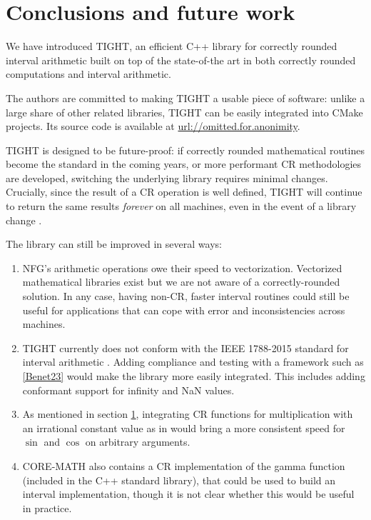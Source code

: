 \section{Conclusions and future work}
We have introduced TIGHT, an efficient C++ library for correctly rounded interval arithmetic built on top of the state-of-the art in both correctly rounded computations and interval arithmetic.

The authors are committed to making TIGHT a usable piece of software: unlike a large share of other related libraries, TIGHT can be easily integrated into CMake projects. Its source code is available at \url{url://omitted.for.anonimity}.

TIGHT is designed to be future-proof: if correctly rounded mathematical routines become the standard in the coming years, or more performant CR methodologies are developed, switching the underlying library requires minimal changes.
Crucially, since the result of a CR operation is well defined, TIGHT will continue to return the same results \emph{forever} on all machines, even in the event of a library change
.

The library can still be improved in several ways:
\begin{enumerate}
	\item NFG's arithmetic operations owe their speed to vectorization. Vectorized mathematical libraries exist \cite{sleef} but we are not aware of a correctly-rounded solution. In any case, having non-CR, faster interval routines could still be useful for applications that can cope with error and inconsistencies across machines.
	\item TIGHT currently does not conform with the IEEE 1788-2015 standard for interval arithmetic \cite{ieee1788}. Adding compliance and testing with a framework such as \ref{Benet23} would make the library more easily integrated. This includes adding conformant support for infinity and NaN values.
	\item As mentioned in section \ref{}, integrating CR functions for multiplication with an irrational constant value as in \cite{crpi} would bring a more consistent speed for $\sin$ and $\cos$ on arbitrary arguments.
	\item CORE-MATH also contains a CR implementation of the gamma function (included in the C++ standard library), that could be used to build an interval implementation, though it is not clear whether this would be useful in practice.
\end{enumerate}

